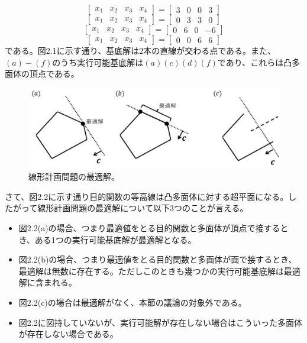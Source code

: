 \documentclass[dvipdfmx, 9pt, a4paper]{jsarticle}
\numberwithin{equation}{section}
\begin{document}
\begin{equation}
\begin{bmatrix}
x_1 & x_2 & x_3 & x_4
\end{bmatrix}=
\begin{bmatrix}
3 & 0 & 0 & 3
\end{bmatrix} \tag{c}
\end{equation}
\begin{equation}
\begin{bmatrix}
x_1 & x_2 & x_3 & x_4
\end{bmatrix}=
\begin{bmatrix}
0 & 3 & 3 & 0
\end{bmatrix} \tag{d}
\end{equation}
\begin{equation}
\begin{bmatrix}
x_1 & x_2 & x_3 & x_4
\end{bmatrix}=
\begin{bmatrix}
0 & 6 & 0 & -6
\end{bmatrix} \tag{e}
\end{equation}
\begin{equation}
\begin{bmatrix}
x_1 & x_2 & x_3 & x_4
\end{bmatrix}=
\begin{bmatrix}
0 & 0 & 6 & 6
\end{bmatrix} \tag{f}
\end{equation}
である。図2.1に示す通り、基底解は2本の直線が交わる点である。また、$(a)-(f)$のうち実行可能基底解は$(a)(c)(d)(f)$であり、これらは凸多面体の頂点である。\par
\begin{figure}[t]
\begin{center}
\includegraphics[width=12cm]{fig2.png}
\caption{線形計画問題の最適解。}
\end{center}
\end{figure}
さて、図2.2に示す通り目的関数の等高線は凸多面体に対する超平面になる。したがって線形計画問題の最適解について以下3つのことが言える。
\begin{itemize}
\item 図2.2(a)の場合、つまり最適値をとる目的関数と多面体が頂点で接するとき、ある1つの実行可能基底解が最適解となる。
\item 図2.2(b)の場合、つまり最適値をとる目的関数と多面体が面で接するとき、最適解は無数に存在する。ただしこのときも幾つかの実行可能基底解は最適解に含まれる。
\item 図2.2(c)の場合は最適解がなく、本節の議論の対象外である。
\item 図2.2に図持していないが、実行可能解が存在しない場合はこういった多面体が存在しない場合である。
\end{itemize}
\end{document}
